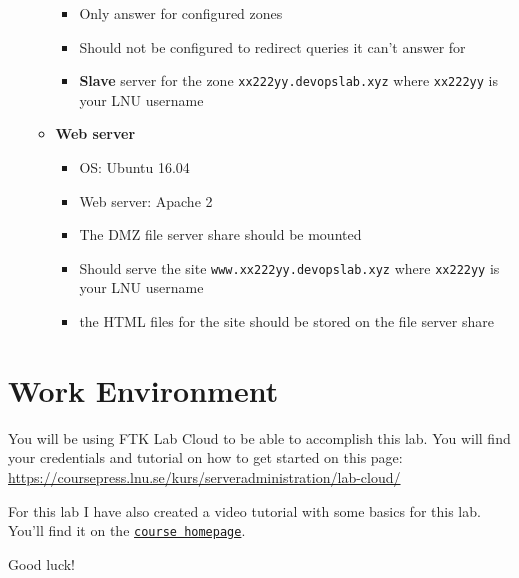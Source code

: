 \documentclass[paper=a4, fontsize=11pt]{report} %
\begin{document}
\begin{itemize}
\begin{itemize}
\begin{itemize}
			\item Only answer for configured zones
			\item Should not be configured to redirect queries it can't answer for
			\item \textbf{Slave} server for the zone \texttt{xx222yy.devopslab.xyz} where \texttt{xx222yy} is your LNU username
        \end{itemize}   
        \item \textbf{Web server}
        \begin{itemize}
			\item OS: Ubuntu 16.04
			\item Web server: Apache 2
			\item The DMZ file server share should be mounted
			\item Should serve the site \texttt{www.xx222yy.devopslab.xyz} where \texttt{xx222yy} is your LNU username
			\item the HTML files for the site should be stored on the file server share
        \end{itemize}  

    \end{itemize}
\end{itemize}

\section{Work Environment}
\label{environment}

You will be using FTK Lab Cloud to be able to accomplish this lab. You will find your credentials and tutorial on how to get started on this page: \href{https://coursepress.lnu.se/kurs/serveradministration/lab-cloud/}{https://coursepress.lnu.se/kurs/serveradministration/lab-cloud/}

For this lab I have also created a video tutorial with some basics for this lab. You'll find it on the \texttt{\href{https://coursepress.lnu.se/kurs/serveradministration/moduler/module-3/laboration}{course homepage}}.

Good luck!
\end{document}
